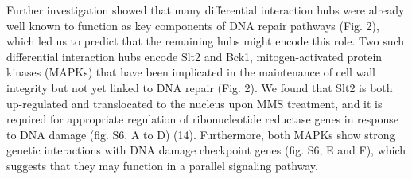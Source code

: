 Further investigation showed that many differential interaction hubs were already well known to function as key components of DNA repair pathways (Fig. 2), which led us to predict that the remaining hubs might encode this role. Two such differential interaction hubs encode Slt2 and Bck1, mitogen-activated protein kinases (MAPKs) that have been implicated in the maintenance of cell wall integrity but not yet linked to DNA repair (Fig. 2). We found that Slt2 is both up-regulated and translocated to the nucleus upon MMS treatment, and it is required for appropriate regulation of ribonucleotide reductase genes in response to DNA damage (fig. S6, A to D) (14). Furthermore, both MAPKs show strong genetic interactions with DNA damage checkpoint genes (fig. S6, E and F), which suggests that they may function in a parallel signaling pathway.


 